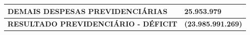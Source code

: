 \documentclass{article}
\begin{document}
\begin{longtable}[c]{m{12cm}m{3cm}}
\multicolumn{1}{L{12cm}}{\hspace{4em} DEMAIS DESPESAS PREVIDENCIÁRIAS} & \multicolumn{1}{R{3cm}}{25.953.979} \\
\hline\hline
\multicolumn{1}{L{12cm}}{\hspace{0em} \textbf{ RESULTADO PREVIDENCIÁRIO - DÉFICIT }} & \multicolumn{1}{R{3cm}}{\textbf{ (23.985.991.269) }} \\\hline\hline\end{longtable}\raggedright\fontsize{7pt}{10pt}\selectfont {Fonte: PPO.} \\\fontsize{7pt}{10pt}\selectfont {ELABORAÇÃO: DCAF/SCPPO/SEPLAG}\\
\end{document}
